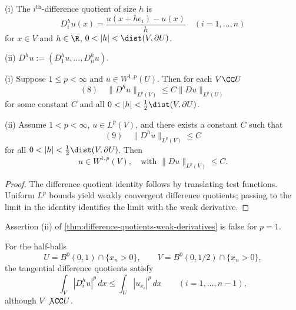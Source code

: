 \begin{definition}
\label{def:difference-quotients}
(i) The $i^{\text{th}}$-difference quotient of size $h$ is
$$D_i^h u(x) = \frac{u(x + he_i) - u(x)}{h} \quad (i = 1, \ldots, n)$$
for $x \in V$ and $h \in \R$, $0 < |h| < \dist(V, \partial U)$.

(ii) $D^h u := (D_1^h u, \ldots, D_n^h u)$.
\end{definition}

\begin{theorem}
\label{thm:difference-quotients-weak-derivatives}
(i) Suppose $1 \le p < \infty$ and $u \in W^{1,p}(U)$. Then for each $V \CC U$
$$(8) \quad \|D^h u\|_{L^p(V)} \le C\|Du\|_{L^p(U)}$$
for some constant $C$ and all $0 < |h| < \frac{1}{2}\dist(V, \partial U)$.

(ii) Assume $1 < p < \infty$, $u \in L^p(V)$, and there exists a constant $C$ such that
$$(9) \quad \|D^h u\|_{L^p(V)} \le C$$
for all $0 < |h| < \frac{1}{2}\dist(V, \partial U)$. Then
$$u \in W^{1,p}(V), \quad \text{with } \|Du\|_{L^p(V)} \le C.$$
\end{theorem}

\begin{proof}
\sketch The difference-quotient identity follows by translating test functions. Uniform $L^p$ bounds yield weakly convergent difference quotients; passing to the limit in the identity identifies the limit with the weak derivative.
\end{proof}

\begin{remark}[Assertion (ii) fails for $p=1$]
\label{rem:difference-quotient-p1-fails}
Assertion (ii) of \cref{thm:difference-quotients-weak-derivatives} is false for $p=1$.
\end{remark}

\begin{remark}
\label{rem:difference-quotient-half-ball-remark}
For the half-balls
$$U=B^0(0,1)\cap\{x_n>0\},\qquad V=B^0(0,1/2)\cap\{x_n>0\},$$
the tangential difference quotients satisfy
$$\int_V |D_i^h u|^p\,dx \le \int_U |u_{x_i}|^p\,dx \qquad (i=1,\ldots,n-1),$$
although $V\not\CC U$.
\end{remark}

